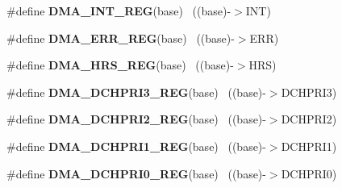 \begin{DoxyCompactItemize}
\item 
\hypertarget{group___d_m_a___register___accessor___macros_ga3603d771ce43a9837f57c8520f8a862b}{}\#define {\bfseries D\+M\+A\+\_\+\+I\+N\+T\+\_\+\+R\+E\+G}(base)                                            ~((base)-\/$>$I\+N\+T)\label{group___d_m_a___register___accessor___macros_ga3603d771ce43a9837f57c8520f8a862b}

\item 
\hypertarget{group___d_m_a___register___accessor___macros_gae16b8a657d914e374c6ac2d4cd536903}{}\#define {\bfseries D\+M\+A\+\_\+\+E\+R\+R\+\_\+\+R\+E\+G}(base)                                            ~((base)-\/$>$E\+R\+R)\label{group___d_m_a___register___accessor___macros_gae16b8a657d914e374c6ac2d4cd536903}

\item 
\hypertarget{group___d_m_a___register___accessor___macros_ga3d3d3aa1a38dc62691ce54cfff91c8d3}{}\#define {\bfseries D\+M\+A\+\_\+\+H\+R\+S\+\_\+\+R\+E\+G}(base)                                            ~((base)-\/$>$H\+R\+S)\label{group___d_m_a___register___accessor___macros_ga3d3d3aa1a38dc62691ce54cfff91c8d3}

\item 
\hypertarget{group___d_m_a___register___accessor___macros_ga6b9a7814c5ed1953b86e4be762730248}{}\#define {\bfseries D\+M\+A\+\_\+\+D\+C\+H\+P\+R\+I3\+\_\+\+R\+E\+G}(base)                                    ~((base)-\/$>$D\+C\+H\+P\+R\+I3)\label{group___d_m_a___register___accessor___macros_ga6b9a7814c5ed1953b86e4be762730248}

\item 
\hypertarget{group___d_m_a___register___accessor___macros_ga13ec4c443192686eab17415f03da15e1}{}\#define {\bfseries D\+M\+A\+\_\+\+D\+C\+H\+P\+R\+I2\+\_\+\+R\+E\+G}(base)                                    ~((base)-\/$>$D\+C\+H\+P\+R\+I2)\label{group___d_m_a___register___accessor___macros_ga13ec4c443192686eab17415f03da15e1}

\item 
\hypertarget{group___d_m_a___register___accessor___macros_gac1c648cce4db93a29c0e7c2c8c4f1820}{}\#define {\bfseries D\+M\+A\+\_\+\+D\+C\+H\+P\+R\+I1\+\_\+\+R\+E\+G}(base)                                    ~((base)-\/$>$D\+C\+H\+P\+R\+I1)\label{group___d_m_a___register___accessor___macros_gac1c648cce4db93a29c0e7c2c8c4f1820}

\item 
\hypertarget{group___d_m_a___register___accessor___macros_gacffb5b880da4762c6e105539dd318788}{}\#define {\bfseries D\+M\+A\+\_\+\+D\+C\+H\+P\+R\+I0\+\_\+\+R\+E\+G}(base)                                    ~((base)-\/$>$D\+C\+H\+P\+R\+I0)\label{group___d_m_a___register___accessor___macros_gacffb5b880da4762c6e105539dd318788}


\end{DoxyCompactItemize}
